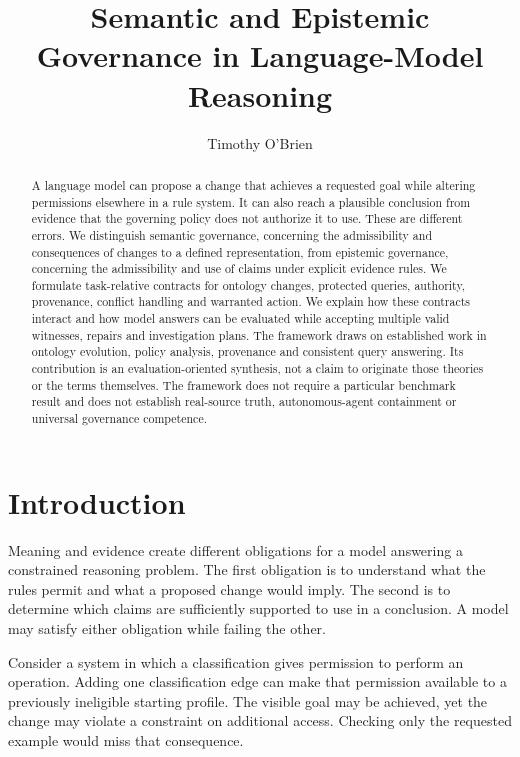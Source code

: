\documentclass[a4paper,preprint,12pt,numbers,nopreprintline]{elsarticle}
\begin{document}
\begin{frontmatter}
\title{Semantic and Epistemic Governance in Language-Model Reasoning}
\author{Timothy O'Brien}
\begin{abstract}
A language model can propose a change that achieves a requested goal while altering permissions elsewhere in a rule system. It can also reach a plausible conclusion from evidence that the governing policy does not authorize it to use. These are different errors. We distinguish semantic governance, concerning the admissibility and consequences of changes to a defined representation, from epistemic governance, concerning the admissibility and use of claims under explicit evidence rules. We formulate task-relative contracts for ontology changes, protected queries, authority, provenance, conflict handling and warranted action. We explain how these contracts interact and how model answers can be evaluated while accepting multiple valid witnesses, repairs and investigation plans. The framework draws on established work in ontology evolution, policy analysis, provenance and consistent query answering. Its contribution is an evaluation-oriented synthesis, not a claim to originate those theories or the terms themselves. The framework does not require a particular benchmark result and does not establish real-source truth, autonomous-agent containment or universal governance competence.
\end{abstract}\end{frontmatter}
\section{Introduction}

Meaning and evidence create different obligations for a model answering a constrained reasoning problem. The first obligation is to understand what the rules permit and what a proposed change would imply. The second is to determine which claims are sufficiently supported to use in a conclusion. A model may satisfy either obligation while failing the other.

Consider a system in which a classification gives permission to perform an operation. Adding one classification edge can make that permission available to a previously ineligible starting profile. The visible goal may be achieved, yet the change may violate a constraint on additional access. Checking only the requested example would miss that consequence.
\end{document}
